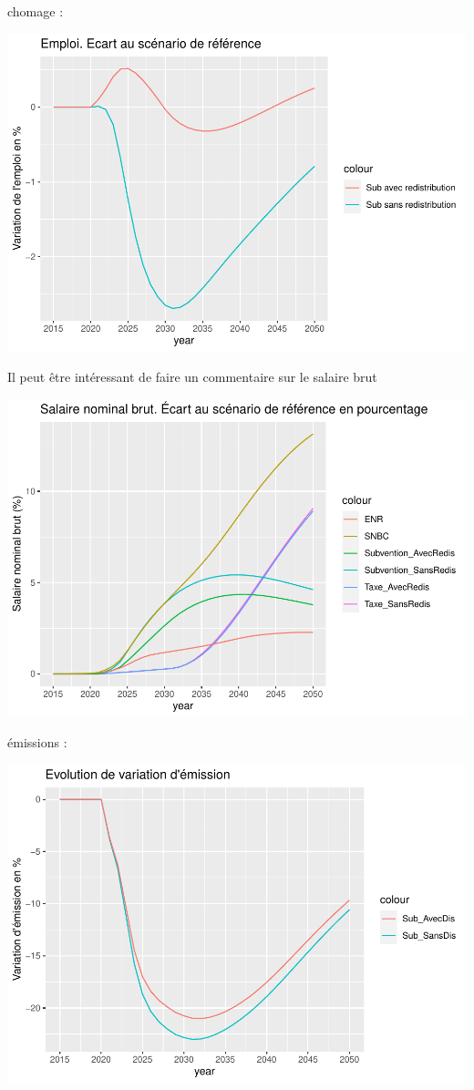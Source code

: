\documentclass[
]{article}
\begin{document}
chomage :

\begin{center}\includegraphics[width=0.7\linewidth,height=0.7\textheight]{Modele-ThreeMe-Tunisie_Sequeira_Valilou_Wang_files/figure-latex/unnamed-chunk-12-1} \end{center}

Il peut être intéressant de faire un commentaire sur le salaire brut

\begin{center}\includegraphics[width=0.7\linewidth,height=0.7\textheight]{Modele-ThreeMe-Tunisie_Sequeira_Valilou_Wang_files/figure-latex/unnamed-chunk-13-1} \end{center}

émissions :

\begin{center}\includegraphics[width=0.7\linewidth,height=0.7\textheight]{Modele-ThreeMe-Tunisie_Sequeira_Valilou_Wang_files/figure-latex/unnamed-chunk-14-1} \end{center}
\end{document}
